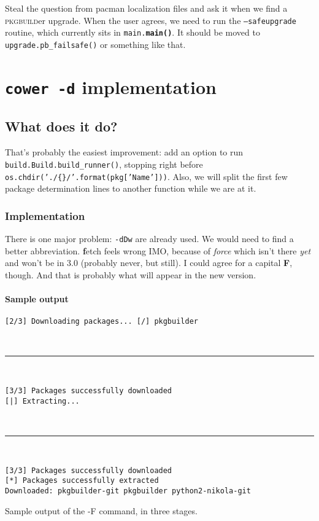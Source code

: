 \documentclass[a4paper,english]{book}
\numberwithin{equation}{section}
\newcommand{\pb}[0]{\textsc{pkgbuild}er}
\newcommand{\p}[1]{\nohyphens{\texttt{#1}}}
\begin{document}
Steal the question from pacman localization files and ask it when we find a \pb{} upgrade.  When the user agrees, we need to run the \p{--safeupgrade} routine, which currently sits in \p{main.\textbf{main()}}.  It should be moved to \p{upgrade.pb\_failsafe()} or something like that.

\part{\p{cower -d} implementation}

\chapter{What does it do?}

That’s probably the easiest improvement: add an option to run \p{build.Build.build\_runner()}, stopping right before \p{os.chdir('./\{\}/'.format(pkg['Name']))}.  Also, we will split the first few package determination lines to another function while we are at it.

\section{Implementation}

There is one major problem: \p{-dDw} are already used.  We would need to find a better abbreviation.  \textbf{f}etch feels wrong IMO, because of \emph{force} which isn’t there \emph{yet} and won’t be in 3.0 (probably never, but still).  I could agree for a capital \textbf{F}, though.  And that is probably what will appear in the new version.

\subsection{Sample output}

\begin{listingf}
\begin{Verbatim}
[2/3] Downloading packages... [/] pkgbuilder
\end{Verbatim}

~

\hrule

~

\begin{Verbatim}
[3/3] Packages successfully downloaded
[|] Extracting...
\end{Verbatim}

~

\hrule

~

\begin{Verbatim}
[3/3] Packages successfully downloaded
[*] Packages successfully extracted
Downloaded: pkgbuilder-git pkgbuilder python2-nikola-git
\end{Verbatim}
\caption{Sample output of the -F command, in three stages.}
\end{listingf}
\end{document}
